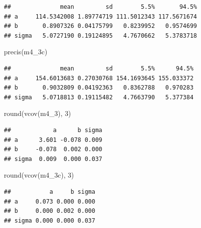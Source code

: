 \documentclass[
]{book}
\newenvironment{Shaded}{\begin{snugshade}}{\end{snugshade}}
\newcommand{\DecValTok}[1]{\textcolor[rgb]{0.00,0.00,0.81}{#1}}
\newcommand{\FunctionTok}[1]{\textcolor[rgb]{0.00,0.00,0.00}{#1}}
\newcommand{\NormalTok}[1]{#1}
\begin{document}
\begin{verbatim}
##              mean         sd        5.5%       94.5%
## a     114.5342008 1.89774719 111.5012343 117.5671674
## b       0.8907326 0.04175799   0.8239952   0.9574699
## sigma   5.0727190 0.19124895   4.7670662   5.3783718
\end{verbatim}

\begin{Shaded}
\begin{Highlighting}[]
\FunctionTok{precis}\NormalTok{(m4\_3c)}
\end{Highlighting}
\end{Shaded}

\begin{verbatim}
##              mean         sd        5.5%      94.5%
## a     154.6013683 0.27030768 154.1693645 155.033372
## b       0.9032809 0.04192363   0.8362788   0.970283
## sigma   5.0718813 0.19115482   4.7663790   5.377384
\end{verbatim}

\begin{Shaded}
\begin{Highlighting}[]
\FunctionTok{round}\NormalTok{(}\FunctionTok{vcov}\NormalTok{(m4\_3), }\DecValTok{3}\NormalTok{)}
\end{Highlighting}
\end{Shaded}

\begin{verbatim}
##            a      b sigma
## a      3.601 -0.078 0.009
## b     -0.078  0.002 0.000
## sigma  0.009  0.000 0.037
\end{verbatim}

\begin{Shaded}
\begin{Highlighting}[]
\FunctionTok{round}\NormalTok{(}\FunctionTok{vcov}\NormalTok{(m4\_3c), }\DecValTok{3}\NormalTok{)}
\end{Highlighting}
\end{Shaded}

\begin{verbatim}
##           a     b sigma
## a     0.073 0.000 0.000
## b     0.000 0.002 0.000
## sigma 0.000 0.000 0.037
\end{verbatim}
\end{document}

